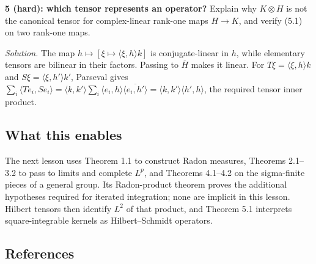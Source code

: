 \documentclass[
  english,
  11pt,
  a4paper,
]{article}
\newcounter{none} %
\begin{document}
\textbf{5 (hard): which tensor represents an operator?} Explain why
\(K\otimes H\) is not the canonical tensor for complex-linear rank-one
maps \(H\to K\), and verify (5.1) on two rank-one maps.

\emph{Solution.} The map \(h\mapsto[\xi\mapsto\langle\xi,h\rangle k]\)
is conjugate-linear in \(h\), while elementary tensors are bilinear in
their factors. Passing to \(\overline H\) makes it linear. For
\(T\xi=\langle\xi,h\rangle k\) and \(S\xi=\langle\xi,h'\rangle k'\),
Parseval gives
\(\sum_i\langle Te_i,Se_i\rangle=\langle k,k'\rangle\sum_i\langle e_i,h\rangle\overline{\langle e_i,h'\rangle}=\langle k,k'\rangle\langle h',h\rangle\),
the required tensor inner product.

\subsection{What this
enables}\label{measure-and-hilbert-space-tools--what-this-enables}

The next lesson uses Theorem 1.1 to construct Radon measures, Theorems
2.1--3.2 to pass to limits and complete \(L^p\), and Theorems 4.1--4.2
on the sigma-finite pieces of a general group. Its Radon-product theorem
proves the additional hypotheses required for iterated integration; none
are implicit in this lesson. Hilbert tensors then identify \(L^2\) of
that product, and Theorem 5.1 interprets square-integrable kernels as
Hilbert--Schmidt operators.

\subsection{References}\label{measure-and-hilbert-space-tools--references}
\end{document}
